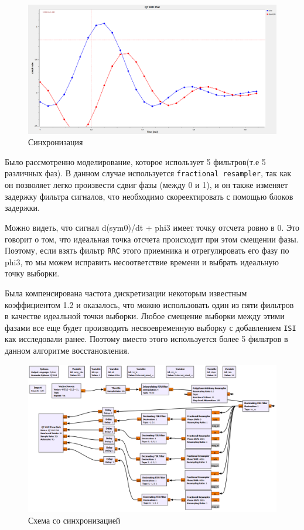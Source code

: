 \documentclass[a4paper]{article}
\begin{document}
            \begin{figure}[H]
                \centering
                \includegraphics[width=\textwidth]{img/p3_6.png}
                \caption{Синхронизация}
                \label{fig:p3_6}
            \end{figure}
            
            Было рассмотренно моделирование, которое использует 5 фильтров(т.е 5 различных фаз). В данном случае используется \texttt{fractional resampler}, так как он позволяет легко произвести сдвиг фазы (между 0 и 1), и он также изменяет задержку фильтра сигналов, что необходимо скореектировать с помощью блоков задержки.
            
            Можно видеть, что сигнал d(sym0)/dt + phi3 имеет точку отсчета ровно в 0. Это говорит о том, что идеальная точка отсчета происходит при этом смещении фазы. Поэтому, если взять фильтр \texttt{RRC} этого приемника и отрегулировать его фазу по phi3, то мы можем исправить несоответствие времени и выбрать идеальную точку выборки.
            
            Была компенсирована частота дискретизации некоторым известным коэффициентом 1.2 и оказалось, что можно использовать один из пяти фильтров в качестве идеальной точки выборки. Любое смещение выборки между этими фазами все еще будет производить несвоевременную выборку с добавлением \texttt{ISI} как исследовали ранее. Поэтому вместо этого используется более 5 фильтров в данном алгоритме восстановления.
            
            \begin{figure}[H]
                \centering
                \includegraphics[width=\textwidth]{img/p3_7.png}
                \caption{Схема со синхронизацией}
                \label{fig:p3_7}
            \end{figure}
            
\end{document}
